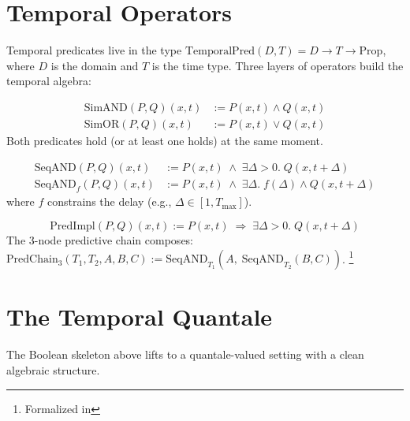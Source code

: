 \documentclass[11pt,openany]{report}
\begin{document}
\section{Temporal Operators}

Temporal predicates live in the type
$\mathrm{TemporalPred}(D, T) = D \to T \to \mathrm{Prop}$,
where $D$ is the domain and $T$ is the time type.  Three layers of
operators build the temporal algebra:

\begin{definition}
\begin{align*}
  \mathrm{SimAND}(P, Q)(x, t) &:= P(x, t) \wedge Q(x, t) \\
  \mathrm{SimOR}(P, Q)(x, t)  &:= P(x, t) \vee Q(x, t)
\end{align*}
Both predicates hold (or at least one holds) at the same moment.
\end{definition}

\begin{definition}
\begin{align*}
  \mathrm{SeqAND}(P, Q)(x, t) &:= P(x, t) \;\wedge\;
    \exists \Delta > 0.\; Q(x, t + \Delta) \\
  \mathrm{SeqAND}_f(P, Q)(x, t) &:= P(x, t) \;\wedge\;
    \exists \Delta.\; f(\Delta) \wedge Q(x, t + \Delta)
\end{align*}
where $f$ constrains the delay (e.g., $\Delta \in [1, T_{\max}]$).
\end{definition}

\begin{definition}
\[
  \mathrm{PredImpl}(P, Q)(x, t) := P(x, t) \;\Rightarrow\;
  \exists \Delta > 0.\; Q(x, t + \Delta)
\]
The 3-node predictive chain composes:
$\mathrm{PredChain}_3(T_1, T_2, A, B, C) :=
\mathrm{SeqAND}_{T_1}(A,\; \mathrm{SeqAND}_{T_2}(B, C))$.%
\footnote{Formalized in
}
\end{definition}


\section{The Temporal Quantale}

The Boolean skeleton above lifts to a quantale-valued setting with
a clean algebraic structure.
\end{document}
